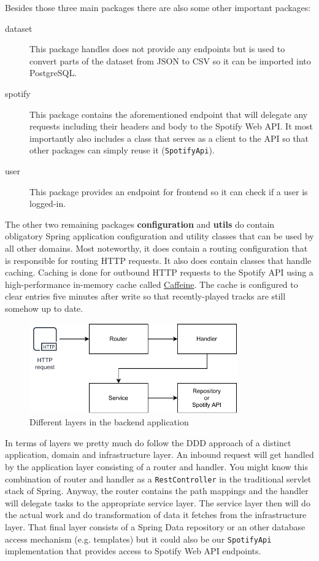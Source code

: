 Besides those three main packages there are also some other important packages:

\begin{description}
    \item[dataset] This package handles does not provide any endpoints but is used to convert parts of the dataset from \acs{JSON} to \acs{CSV} so it can be imported into PostgreSQL.
    \item[spotify] This package contains the aforementioned endpoint that will delegate any requests including their headers and body to the Spotify Web API. It most importantly also includes a class that serves as a client to the API so that other packages can simply reuse it (\texttt{SpotifyApi}).
    \item[user] This package provides an endpoint for frontend so it can check if a user is logged-in.
\end{description}

The other two remaining packages \textbf{configuration} and \textbf{utils} do contain obligatory Spring application configuration and utility classes that can be used by all other domains. Most noteworthy, it does contain a routing configuration that is responsible for routing \ac{HTTP} requests. It also does contain classes that handle caching. Caching is done for outbound \ac{HTTP} requests to the Spotify API using a high-performance in-memory cache called \href{https://github.com/ben-manes/caffeine}{Caffeine}. The cache is configured to clear entries five minutes after write so that recently-played tracks are still somehow up to date.

\begin{figure}[bth]
    \centering
    \includegraphics[width=0.8\textwidth]{Graphics/Chapter3/backend-layers.pdf}
    \caption{Different layers in the backend application}
\end{figure}

In terms of layers we pretty much do follow the \ac{DDD} approach of a distinct application, domain and infrastructure layer. An inbound request will get handled by the application layer consisting of a router and handler. You might know this combination of router and handler as a \texttt{RestController} in the traditional servlet stack of Spring. Anyway, the router contains the path mappings and the handler will delegate tasks to the appropriate service layer. The service layer then will do the actual work and do transformation of data it fetches from the infrastructure layer. That final layer consists of a Spring Data repository or an other database access mechanism (e.g. templates) but it could also be our \texttt{SpotifyApi} implementation that provides access to Spotify Web API endpoints.

